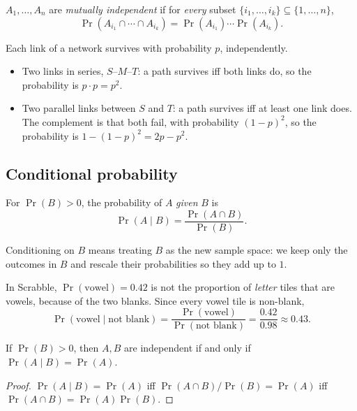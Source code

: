 \begin{definition}
$A_1,\dots,A_n$ are \emph{mutually independent} if for \emph{every} subset $\{i_1,\dots,i_k\}\subseteq\{1,\dots,n\}$,
\[
\Pr(A_{i_1}\cap\cdots\cap A_{i_k}) = \Pr(A_{i_1})\cdots\Pr(A_{i_k}).
\]
\end{definition}

\begin{example}
Each link of a network survives with probability $p$, independently.
\begin{itemize}
    \item Two links in series, $S$--$M$--$T$: a path survives iff both links do, so the probability is $p\cdot p=p^2$.
    \item Two parallel links between $S$ and $T$: a path survives iff at least one link does. The complement is that both fail, with probability $(1-p)^2$, so the probability is $1-(1-p)^2=2p-p^2$.
\end{itemize}
\end{example}

\subsection{Conditional probability}
\label{sec:9-8}

\begin{definition}
For $\Pr(B)>0$, the probability of $A$ \emph{given} $B$ is
\[
\Pr(A\mid B) = \frac{\Pr(A\cap B)}{\Pr(B)}.
\]
\end{definition}

\begin{note}
Conditioning on $B$ means treating $B$ as the new sample space: we keep only the outcomes in $B$ and rescale their probabilities so they add up to $1$.
\end{note}

\begin{example}
In Scrabble, $\Pr(\text{vowel})=0.42$ is not the proportion of \emph{letter} tiles that are vowels, because of the two blanks. Since every vowel tile is non-blank,
\[
\Pr(\text{vowel}\mid\text{not blank})=\frac{\Pr(\text{vowel})}{\Pr(\text{not blank})}=\frac{0.42}{0.98}\approx0.43.
\]
\end{example}

\begin{proposition}
If $\Pr(B)>0$, then $A,B$ are independent if and only if $\Pr(A\mid B)=\Pr(A)$.
\end{proposition}
\begin{proof}
$\Pr(A\mid B)=\Pr(A)$ iff $\Pr(A\cap B)/\Pr(B)=\Pr(A)$ iff $\Pr(A\cap B)=\Pr(A)\Pr(B)$.
\end{proof}

